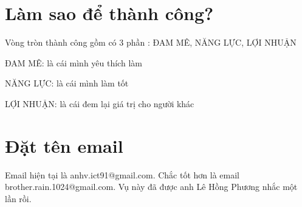 \chapter{Làm sao để thành công?}


Vòng tròn thành công gồm có 3 phần : ĐAM MÊ, NĂNG LỰC, LỢI NHUẬN

ĐAM MÊ: là cái mình yêu thích làm


NĂNG LỰC: là cái mình làm tốt

LỢI NHUẬN: là cái đem lại giá trị cho người khác

\chapter{Đặt tên email}

Email hiện tại là anhv.ict91@gmail.com. Chắc tốt hơn là email brother.rain.1024@gmail.com. Vụ này đã được anh Lê Hồng Phương nhắc một lần rồi.